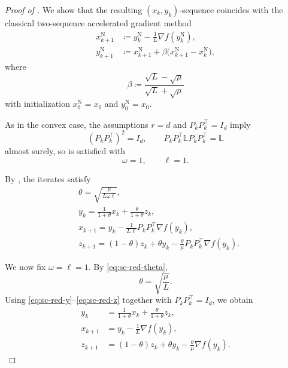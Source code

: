 \documentclass[10pt]{article}
\newcommand{\Lmat}{\mathbb{L}}
\begin{document}
\begin{proof}[Proof of ]
We show that the resulting \((x_k,y_k)\)-sequence coincides with the classical
two-sequence accelerated gradient method
\begin{align}
x_{k+1}^{\mathrm{N}}
&\coloneqq y_k^{\mathrm{N}} - \frac{1}{L}\nabla f(y_k^{\mathrm{N}}),
\label{eq:NAG-sc-x-final}\\
y_{k+1}^{\mathrm{N}}
&\coloneqq x_{k+1}^{\mathrm{N}} + \beta\bigl(x_{k+1}^{\mathrm{N}}-x_k^{\mathrm{N}}\bigr),
\label{eq:NAG-sc-y-final}
\end{align}
where
\begin{equation}
\beta \coloneqq \frac{\sqrt{L}-\sqrt{\mu}}{\sqrt{L}+\sqrt{\mu}}
\label{eq:beta-classical}
\end{equation}
with initialization \(x_0^{\mathrm{N}}=x_0\) and \(y_0^{\mathrm{N}}=x_0\).

As in the convex case, the assumptions \(r=d\) and \(P_kP_k^\top=I_d\)
imply
\[
(P_kP_k^\top)^2 = I_d,
\qquad
P_kP_k^\top \Lmat P_kP_k^\top = \Lmat
\]
almost surely, so  is satisfied
with
\[
\omega = 1,
\qquad
\ell = 1.
\]


By , the iterates satisfy
\begin{align}
&\theta = \sqrt{\frac{\mu}{L\omega\ell}}, \label{eq:sc-red-theta}\\
&y_k = \frac{1}{1+\theta}x_k + \frac{\theta}{1+\theta}z_k, \label{eq:sc-red-y}\\
&x_{k+1} = y_k - \frac{1}{L\ell}P_kP_k^\top \nabla f(y_k), \label{eq:sc-red-x}\\
&z_{k+1} = (1-\theta)z_k + \theta y_k - \frac{\theta}{\mu}P_kP_k^\top \nabla f(y_k). \label{eq:sc-red-z}
\end{align}

We now fix \(\omega=\ell=1\). By \eqref{eq:sc-red-theta},
\[
\theta=\sqrt{\frac{\mu}{L}}.
\]
Using \eqref{eq:sc-red-y}--\eqref{eq:sc-red-z} together with \(P_kP_k^\top=I_d\), we obtain
\begin{align}
y_k &= \frac{1}{1+\theta}x_k + \frac{\theta}{1+\theta}z_k,
\label{eq:sc-full-y-proof}\\
x_{k+1} &= y_k - \frac{1}{L}\nabla f(y_k),
\label{eq:sc-full-x-proof}\\
z_{k+1} &= (1-\theta)z_k + \theta y_k - \frac{\theta}{\mu}\nabla f(y_k).
\label{eq:sc-full-z-proof}
\end{align}


\end{proof}
\end{document}
